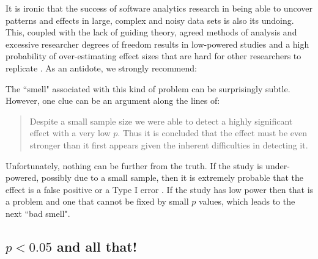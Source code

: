 \documentclass[preprint,10pt]{elsarticle}
\begin{document}
It is ironic that the success of software analytics research in being able to uncover patterns and effects in large, complex and noisy data sets is also its undoing.  This, coupled with the lack of guiding theory, agreed methods of analysis and excessive researcher degrees of freedom \cite{Silb15,Loke17} results in low-powered studies and a high probability of over-estimating effect sizes that are hard for other researchers to replicate \cite{Ioan05,Shep14,Jorg16}.  As an antidote, we strongly recommend:


\noindent
The ``smell" associated with this kind of problem can be surprisingly subtle.  However, one clue can be an argument along the lines of:
\begin{quote}
    Despite a small sample size we were able to detect a highly significant effect with a very low $p$. Thus it is concluded that the effect must be even stronger than it first appears given the inherent difficulties in detecting it.
\end{quote}

\noindent
Unfortunately, nothing can be further from the truth.  If the study is under-powered, possibly due to a small sample, then it is extremely probable that the effect is a false positive or a Type I error \cite{Loke17}.  If the study has low power then that is a problem and one that cannot be fixed by small $p$ values, which leads to the next ``bad smell".


\subsection{$p<0.05$ and all that!}
\end{document}
